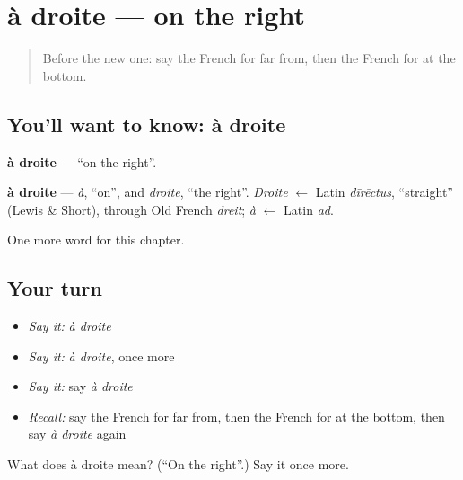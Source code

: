 \section[à droite]{à droite — on the right}

\label{lesson:FR-C188-a-droite}



\begin{quote}
Before the new one: say the French for far from, then the French for at the bottom.
\end{quote}

\subsection*{You'll want to know: à droite}
\textbf{à droite} — \textquotedblleft{}on the right\textquotedblright{}.

\begin{cousinweb}
\textbf{à droite} — \emph{à}, \textquotedblleft{}on\textquotedblright{}, and \emph{droite}, \textquotedblleft{}the right\textquotedblright{}. \emph{Droite} $\leftarrow$ Latin \emph{dīrēctus}, \textquotedblleft{}straight\textquotedblright{} (Lewis \& Short), through Old French \emph{dreit}; \emph{à} $\leftarrow$ Latin \emph{ad}.
\end{cousinweb}

\begin{grammarlens}[title={What you've built}]
One more word for this chapter.
\end{grammarlens}

\subsection*{Your turn}
\begin{itemize}
\raggedright
  \item \emph{Say it:} \emph{à droite}
  \item \emph{Say it:} \emph{à droite}, once more
  \item \emph{Say it:} say \emph{à droite}
  \item \emph{Recall:} say the French for far from, then the French for at the bottom, then say \emph{à droite} again
\end{itemize}

\begin{tcolorbox}[breakable,colback=teal!4,colframe=teal!35!black,title={Before you move on}]
What does à droite mean? (\textquotedblleft{}On the right\textquotedblright{}.) Say it once more.
\end{tcolorbox}
